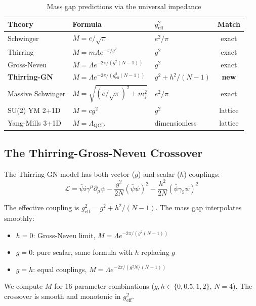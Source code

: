 \documentclass[11pt]{article}
\begin{document}
\begin{table}[h]
\centering
\caption{Mass gap predictions via the universal impedance}
\begin{tabular}{@{}lllc@{}}
\toprule
Theory & Formula & $g_{\text{eff}}^2$ & Match \\
\midrule
Schwinger & $M = e/\sqrt{\pi}$ & $e^2/\pi$ & exact \\
Thirring & $M = m\Lambda e^{-\pi/g^2}$ & $g^2$ & exact \\
Gross-Neveu & $M = \Lambda e^{-2\pi/(g^2(N-1))}$ & $g^2$ & exact \\
\textbf{Thirring-GN} & $M = \Lambda e^{-2\pi/(g_{\text{eff}}^2(N-1))}$ & $g^2 + h^2/(N\!-\!1)$ & \textbf{new} \\
Massive Schwinger & $M = \sqrt{(e/\sqrt{\pi})^2 + m_f^2}$ & $e^2/\pi$ & exact \\
SU(2) YM 2+1D & $M = cg^2$ & $g^2$ & lattice \\
Yang-Mills 3+1D & $M = \Lambda_{\text{QCD}}$ & dimensionless & lattice \\
\bottomrule
\end{tabular}
\end{table}

\subsection{The Thirring-Gross-Neveu Crossover}

The Thirring-GN model has both vector ($g$) and scalar ($h$) couplings:
\begin{equation}
    \mathcal{L} = \bar\psi i\gamma^\mu \partial_\mu \psi - \frac{g^2}{2N}(\bar\psi\psi)^2 - \frac{h^2}{2N}(\bar\psi\gamma_5\psi)^2
\end{equation}

The effective coupling is $g_{\text{eff}}^2 = g^2 + h^2/(N-1)$. The mass gap interpolates smoothly:
\begin{itemize}
    \item $h = 0$: Gross-Neveu limit, $M = \Lambda e^{-2\pi/(g^2(N-1))}$
    \item $g = 0$: pure scalar, same formula with $h$ replacing $g$
    \item $g = h$: equal couplings, $M = \Lambda e^{-2\pi/(g^2 N/(N-1))}$
\end{itemize}

We compute $M$ for 16 parameter combinations ($g, h \in \{0, 0.5, 1, 2\}$, $N = 4$). The crossover is smooth and monotonic in $g_{\text{eff}}^2$.
\end{document}
